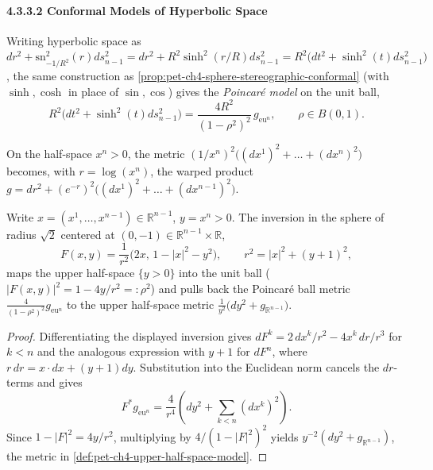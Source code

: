 \paragraph{4.3.3.2 Conformal Models of Hyperbolic Space}

\begin{proposition}
  \label{prop:pet-ch4-poincare-disc-model}
  Writing hyperbolic space as
  $dr^2+\mathrm{sn}_{-1/R^2}^2(r)ds_{n-1}^2=dr^2+R^2\sinh^2(r/R)ds_{n-1}^2
  =R^2\big(dt^2+\sinh^2(t)ds_{n-1}^2\big)$, the same construction as
  \cref{prop:pet-ch4-sphere-stereographic-conformal} (with $\sinh,\cosh$ in
  place of $\sin,\cos$) gives the \emph{Poincaré model} on the unit ball,
  \[
    R^2\big(dt^2+\sinh^2(t)ds_{n-1}^2\big)=\frac{4R^2}{(1-\rho^2)^2}\,g_{\mathrm{eu}^n},
    \qquad\rho\in B(0,1).
  \]
\end{proposition}

\begin{definition}
  \label{def:pet-ch4-upper-half-space-model}
  \leanok
  On the half-space $x^n>0$, the metric $(1/x^n)^2\big((dx^1)^2+\dots+(dx^n)^2\big)$
  becomes, with $r=\log(x^n)$, the warped product
  $g=dr^2+(e^{-r})^2\big((dx^1)^2+\dots+(dx^{n-1})^2\big)$.
\end{definition}

\begin{theorem}
  \label{thm:pet-ch4-inversion-isometry}
  Write $x=(x^1,\dots,x^{n-1})\in\mathbb{R}^{n-1}$, $y=x^n>0$. The inversion in the
  sphere of radius $\sqrt2$ centered at $(0,-1)\in\mathbb{R}^{n-1}\times\mathbb{R}$,
  \[
    F(x,y)=\frac1{r^2}\big(2x,\,1-|x|^2-y^2\big),\qquad r^2=|x|^2+(y+1)^2,
  \]
  maps the upper half-space $\{y>0\}$ into the unit ball ($|F(x,y)|^2=1-4y/r^2=:\rho^2$)
  and pulls back the Poincaré ball metric $\tfrac4{(1-\rho^2)^2}g_{\mathrm{eu}^n}$
  to the upper half-space metric $\tfrac1{y^2}\big(dy^2+g_{\mathbb{R}^{n-1}}\big)$.
\end{theorem}
\begin{proof}
  \sketch
  Differentiating the displayed inversion gives
  $dF^k=2\,dx^k/r^2-4x^k\,dr/r^3$ for $k<n$ and the analogous expression with
  $y+1$ for $dF^n$, where $r\,dr=x\cdot dx+(y+1)dy$. Substitution into the
  Euclidean norm cancels the $dr$-terms and gives
  \[
    F^*g_{\mathrm{eu}^n}=\frac4{r^4}
    \left(dy^2+\sum_{k<n}(dx^k)^2\right).
  \]
  Since $1-|F|^2=4y/r^2$, multiplying by $4/(1-|F|^2)^2$ yields
  $y^{-2}(dy^2+g_{\mathbb R^{n-1}})$, the metric in
  \cref{def:pet-ch4-upper-half-space-model}.
\end{proof}

